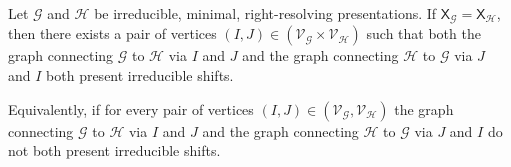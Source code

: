 \documentclass{article}
\newcommand{\Gc}{\mathcal{G}}  %
\newcommand{\Hc}{\mathcal{H}}  %
\newcommand{\Vc}{\mathcal{V}}
\newcommand{\shift}[1]{\mathsf{X}_{#1}}
\theoremstyle{definition}
\begin{document}
    \begin{theorem}
        Let \(\Gc\) and \(\Hc\) be irreducible, minimal, right-resolving presentations. 
        If \(\shift{\Gc} = \shift{\Hc}\), then there exists a pair
        of vertices \((I, J) \in (\Vc_\Gc \times \Vc_\Hc)\) such that both the graph connecting \(\Gc\) to \(\Hc\) via 
        \(I\) and \(J\) and the graph connecting \(\Hc\) to \(\Gc\) via \(J\) and \(I\) both 
        present irreducible shifts.

        Equivalently, if for every pair of vertices \((I, J) \in (\Vc_\Gc, \Vc_\Hc)\) 
        the graph connecting \(\Gc\) to \(\Hc\) via \(I\) and \(J\) 
        and the graph connecting \(\Hc\) to \(\Gc\) via \(J\) and \(I\)
        do not both present irreducible shifts.
    \end{theorem}
\end{document}
